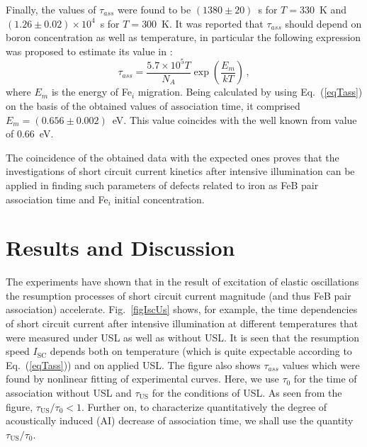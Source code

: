 \documentclass[sn-mathphys]{sn-jnl}%
\theoremstyle{thmstyleone}%
\theoremstyle{thmstyletwo}%
\theoremstyle{thmstylethree}%
\begin{document}
Finally, the values of $\tau_{ass}$ were found
  to be $(1380\pm20)$~s for $T=330$~K and $(1.26\pm0.02)\times10^4$~s for $T=300$~K.
  It was reported that $\tau_{ass}$ should depend on boron concentration as well as temperature,
  in particular the following expression was proposed to estimate its value in \cite{FeBAssJAP2014}:
\begin{equation}
\label{eqTass}
\tau_{ass}=\frac{5.7\times10^5T}{N_A}\exp\left(\frac{E_m}{kT}\right)\,,
\end{equation}
where
$E_m$ is the energy of Fe$_i$ migration.
Being calculated by using Eq.~(\ref{eqTass}) on the basis of the obtained
values of association time, it comprised $E_m=(0.656\pm0.002)$~eV.
This value coincides with the well known from \cite{FeBAssJAP2014,FeBkinAPL2008} value  of 0.66~eV.

The coincidence of the obtained data with the expected ones
proves that the investigations of short circuit current kinetics
after intensive illumination can be applied in finding such parameters of defects related to iron
as FeB pair association time and Fe$_i$ initial concentration.

\section{Results and Discussion}

The experiments have shown that in the result of excitation of elastic oscillations
the resumption processes of short circuit current magnitude (and thus FeB pair association) accelerate.
Fig.~\ref{figIscUs} shows, for example, the time dependencies of short circuit current
after intensive illumination at different temperatures
that were measured under USL as well as without USL.
It is seen that the resumption speed $I_\mathrm{SC}$ depends both on temperature
(which is quite expectable according to Eq.~(\ref{eqTass})) and on applied USL.
The figure also shows $\tau_{ass}$ values which were found by nonlinear fitting of experimental curves.
Here, we use $\tau_{0}$ for the time of association without USL
and $\tau_\mathrm{US}$ for the conditions of USL.
As seen from the figure, $\tau_\mathrm{US}/\tau_{0}< 1$.
Further on, to characterize quantitatively the degree of
acoustically induced (AI) decrease of association time, we shall use the quantity $\tau_\mathrm{US}/\tau_{0}$.
\end{document}
